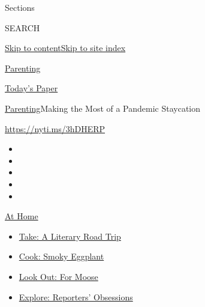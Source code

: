 Sections

SEARCH

\protect\hyperlink{site-content}{Skip to
content}\protect\hyperlink{site-index}{Skip to site index}

\href{https://www.nytimes3xbfgragh.onion/section/parenting}{Parenting}

\href{https://myaccount.nytimes3xbfgragh.onion/auth/login?response_type=cookie\&client_id=vi}{}

\href{https://www.nytimes3xbfgragh.onion/section/todayspaper}{Today's
Paper}

\href{/section/parenting}{Parenting}\textbar{}Making the Most of a
Pandemic Staycation

\url{https://nyti.ms/3hDHERP}

\begin{itemize}
\item
\item
\item
\item
\item
\end{itemize}

\href{https://www.nytimes3xbfgragh.onion/spotlight/at-home?action=click\&pgtype=Article\&state=default\&region=TOP_BANNER\&context=at_home_menu}{At
Home}

\begin{itemize}
\tightlist
\item
  \href{https://www.nytimes3xbfgragh.onion/2020/07/28/books/time-for-a-literary-road-trip.html?action=click\&pgtype=Article\&state=default\&region=TOP_BANNER\&context=at_home_menu}{Take:
  A Literary Road Trip}
\item
  \href{https://www.nytimes3xbfgragh.onion/2020/07/29/magazine/bored-with-your-home-cooking-some-smoky-eggplant-will-fix-that.html?action=click\&pgtype=Article\&state=default\&region=TOP_BANNER\&context=at_home_menu}{Cook:
  Smoky Eggplant}
\item
  \href{https://www.nytimes3xbfgragh.onion/2020/07/27/travel/moose-michigan-isle-royale.html?action=click\&pgtype=Article\&state=default\&region=TOP_BANNER\&context=at_home_menu}{Look
  Out: For Moose}
\item
  \href{https://www.nytimes3xbfgragh.onion/interactive/2020/at-home/even-more-reporters-editors-diaries-lists-recommendations.html?action=click\&pgtype=Article\&state=default\&region=TOP_BANNER\&context=at_home_menu}{Explore:
  Reporters' Obsessions}
\end{itemize}

